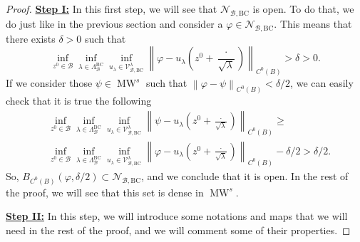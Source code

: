 \documentclass{amsart}
\theoremstyle{definition}
\theoremstyle{remark}
\renewcommand\geq\geqslant
\numberwithin{equation}{section}
\theoremstyle{definition}
\theoremstyle{remark}
\DeclareMathOperator\MW{MW}
\begin{document}
\begin{proof}
	\textbf{	\underline{Step I:}} In this first step, we will see that $\mathcal{N}_{\mathcal{B},\mathrm{BC}}$ is open. To do that, we do just like in the previous section and consider a $\varphi\in\mathcal{N}_{\mathcal{B},\mathrm{BC}}$. This means that there exists $\delta>0$ such that \begin{equation}	\inf_{ z^0\in\mathcal B}\inf_{\lambda\in\Lambda_{\mathcal{B}}^{\mathrm{BC}}}\inf_{u_\lambda \in\mathcal{V}_{\mathcal{B},\mathrm{BC}}^\lambda}\left\|\varphi-u_\lambda\left(z^0+\frac{\cdot}{\sqrt{\lambda}}\right)\right\|_{C^0\left(B\right)}>\delta>0.\end{equation}If we consider those $\psi\in\MW^s$ such that $\left\|\varphi-\psi\right\|_{C^0\left(B\right)}<\delta/2$, we can easily check that it is true the following \begin{equation}\begin{aligned}	&\inf_{ z^0\in\mathcal B}\inf_{\lambda\in\Lambda_{\mathcal{B}}^{\mathrm{BC}}}\inf_{u_\lambda \in\mathcal{V}_{\mathcal{B},\mathrm{BC}}^\lambda}\left\|\psi-u_\lambda\left(z^0+\frac{\cdot}{\sqrt{\lambda}}\right)\right\|_{C^0\left(B\right)}\geq\\&	\inf_{ z^0\in\mathcal B}\inf_{\lambda\in\Lambda_{\mathcal{B}}^{\mathrm{BC}}}\inf_{u_\lambda \in\mathcal{V}_{\mathcal{B},\mathrm{BC}}^\lambda}\left\|\varphi-u_\lambda\left(z^0+\frac{\cdot}{\sqrt{\lambda}}\right)\right\|_{C^0\left(B\right)}-\delta/2>\delta/2.\end{aligned}\end{equation}So, $B_{C^0\left(B\right)}\left(\varphi,\delta/2\right)\subset\mathcal{N}_{\mathcal{B},\mathrm{BC}}$, and we conclude that it is open. In the rest of the proof, we will see that this set is dense in $\MW^s$. 
    
    
    \textbf{	\underline{Step II:}} In this step, we will introduce some notations and maps that we will need in the rest of the proof, and we will comment some of their properties.


\end{proof}
\end{document}
